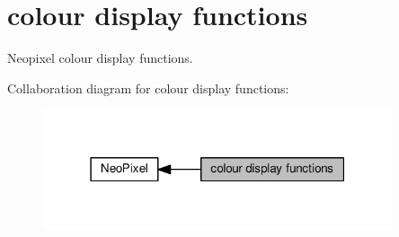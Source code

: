 \hypertarget{group___neo_pixel___display}{}\section{colour display functions}
\label{group___neo_pixel___display}


Neopixel colour display functions.  


Collaboration diagram for colour display functions\+:\nopagebreak
\begin{figure}[H]
\begin{center}
\leavevmode
\includegraphics[width=291pt]{d5/d15/group___neo_pixel___display}
\end{center}
\end{figure}
